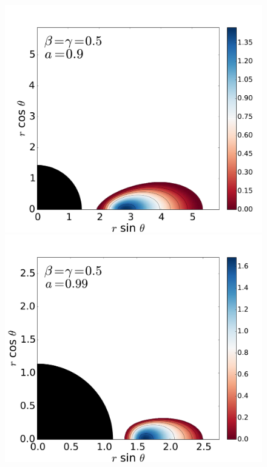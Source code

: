 \documentclass[referee]{aa}
\begin{document}
\begin{figure}
\includegraphics[scale=0.14]{figures/fig2_2_2.pdf}
\hspace{-0.2cm}
\includegraphics[scale=0.14]{figures/fig2_2_3.pdf}
\\

\end{figure}
\end{document}
